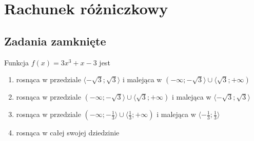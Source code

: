 \setcounter{parc}{0}
\addtocounter{chapc}{1}

\chapter{Rachunek różniczkowy}

\section{Zadania zamknięte}

\zadanie Funkcja $f(x) = 3x^3 + x - 3$ jest
\begin{enumerate}[label=\alph*)]
	\item rosnąca w przedziale $ \langle -\sqrt{3}; \sqrt{3} \rangle $ i malejąca w $ ( -\infty; -\sqrt{3} \rangle \cup \langle \sqrt{3}; +\infty ) $
	\item rosnąca w przedziale $ ( -\infty; -\sqrt{3} \rangle \cup \langle \sqrt{3}; +\infty ) $ i malejąca w $ \langle -\sqrt{3}; \sqrt{3} \rangle $
	\item rosnąca w przedziale $ ( -\infty; -\frac{1}{3} \rangle \cup \langle \frac{1}{3}; +\infty ) $ i malejąca w $ \langle -\frac{1}{3}; \frac{1}{3} \rangle $
	\item rosnąca w całej swojej dziedzinie
\end{enumerate}